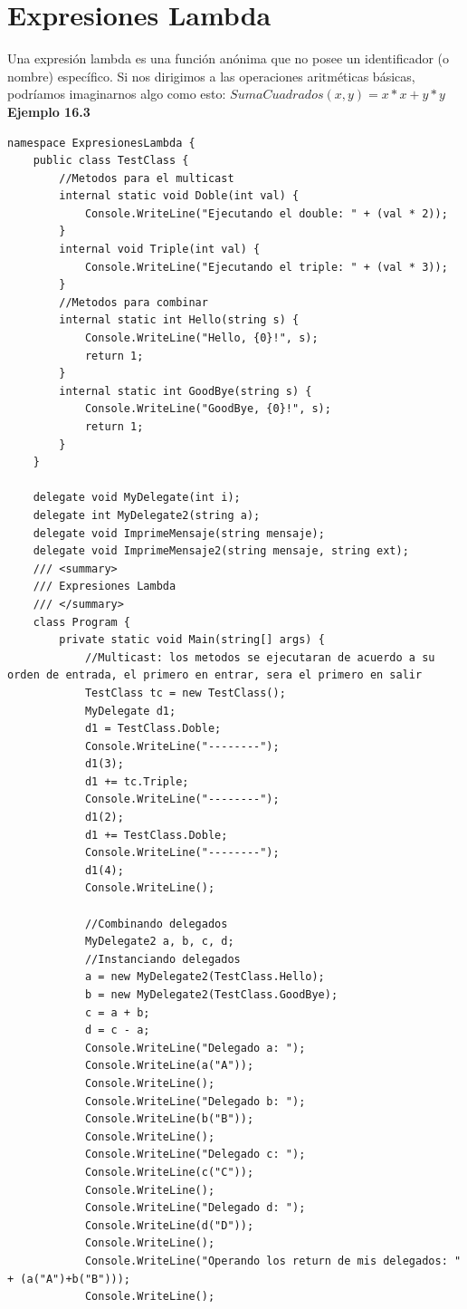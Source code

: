 \documentclass[12pt,a4paper]{report}
\begin{document}
\section{Expresiones Lambda}
Una expresión lambda es una función anónima que no posee un identificador (o nombre) específico. Si nos dirigimos a las operaciones aritméticas básicas, podríamos imaginarnos algo como esto: $SumaCuadrados(x, y) = x*x + y*y$\\\textbf{Ejemplo 16.3}
\begin{lstlisting}
namespace ExpresionesLambda {
    public class TestClass {
        //Metodos para el multicast
        internal static void Doble(int val) {
            Console.WriteLine("Ejecutando el double: " + (val * 2));
        }
        internal void Triple(int val) {
            Console.WriteLine("Ejecutando el triple: " + (val * 3));
        }
        //Metodos para combinar
        internal static int Hello(string s) {
            Console.WriteLine("Hello, {0}!", s);
            return 1;
        }
        internal static int GoodBye(string s) {
            Console.WriteLine("GoodBye, {0}!", s);
            return 1;
        }
    }
    
    delegate void MyDelegate(int i);
    delegate int MyDelegate2(string a);
    delegate void ImprimeMensaje(string mensaje);
    delegate void ImprimeMensaje2(string mensaje, string ext);
    /// <summary>
    /// Expresiones Lambda
    /// </summary>
    class Program {
        private static void Main(string[] args) {
            //Multicast: los metodos se ejecutaran de acuerdo a su orden de entrada, el primero en entrar, sera el primero en salir
            TestClass tc = new TestClass();
            MyDelegate d1;
            d1 = TestClass.Doble;
            Console.WriteLine("--------");
            d1(3);
            d1 += tc.Triple;
            Console.WriteLine("--------");
            d1(2);
            d1 += TestClass.Doble;
            Console.WriteLine("--------");
            d1(4);
            Console.WriteLine();

            //Combinando delegados
            MyDelegate2 a, b, c, d;
            //Instanciando delegados
            a = new MyDelegate2(TestClass.Hello);
            b = new MyDelegate2(TestClass.GoodBye);
            c = a + b;
            d = c - a;
            Console.WriteLine("Delegado a: ");
            Console.WriteLine(a("A"));
            Console.WriteLine();
            Console.WriteLine("Delegado b: ");
            Console.WriteLine(b("B"));
            Console.WriteLine();
            Console.WriteLine("Delegado c: ");
            Console.WriteLine(c("C"));
            Console.WriteLine();
            Console.WriteLine("Delegado d: ");
            Console.WriteLine(d("D"));
            Console.WriteLine();
            Console.WriteLine("Operando los return de mis delegados: " + (a("A")+b("B")));
            Console.WriteLine();


\end{lstlisting}
\end{document}
